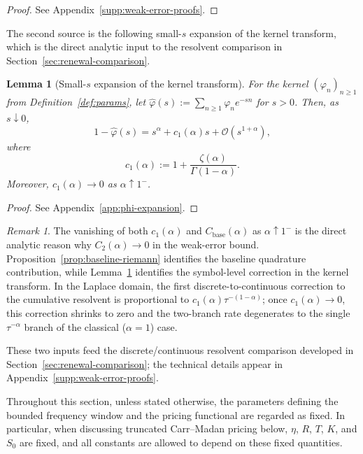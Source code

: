 \documentclass[letterpaper]{article}
\numberwithin{equation}{section}
\newtheorem{lemma}[theorem]{Lemma}
\theoremstyle{definition}
\theoremstyle{remark}
\newtheorem{remark}[theorem]{Remark}
\begin{document}
\begin{proof}
See Appendix~\ref{supp:weak-error-proofs}.
\end{proof}

The second source is the following small-$s$ expansion of the kernel transform,
which is the direct analytic input to the resolvent comparison in
Section~\ref{sec:renewal-comparison}.

\begin{lemma}[Small-$s$ expansion of the kernel transform]\label{lem:phi-expansion}
For the kernel $(\varphi_n)_{n\ge1}$ from Definition~\ref{def:params}, let $\hat\varphi(s):=\sum_{n\ge1}\varphi_n e^{-sn}$ for $s>0$. Then, as $s\downarrow0$,
\begin{equation}\label{eq:phi-expansion-main}
  1-\hat\varphi(s)=s^\alpha+c_1(\alpha)s+\mathcal O(s^{1+\alpha}),
\end{equation}
where
\begin{equation}\label{eq:c1-alpha-main}
  c_1(\alpha):=1+\frac{\zeta(\alpha)}{\Gamma(1-\alpha)}.
\end{equation}
Moreover, $c_1(\alpha)\to0$ as $\alpha\uparrow1^-$.
\end{lemma}

\begin{proof}
See Appendix~\ref{app:phi-expansion}.
\end{proof}

\begin{remark}
The vanishing of both $c_1(\alpha)$ and $C_{\mathrm{base}}(\alpha)$ as
$\alpha\uparrow1^-$ is the direct analytic reason why $C_2(\alpha)\to0$ in the
weak-error bound. Proposition~\ref{prop:baseline-riemann} identifies the
baseline quadrature contribution, while Lemma~\ref{lem:phi-expansion}
identifies the symbol-level correction in the kernel transform. In the Laplace
domain, the first discrete-to-continuous correction to the cumulative resolvent
is proportional to $c_1(\alpha)\tau^{-(1-\alpha)}$; once
$c_1(\alpha)\to0$, this correction shrinks to zero and the two-branch rate
degenerates to the single $\tau^{-\alpha}$ branch of the classical
($\alpha=1$) case.
\end{remark}

These two inputs feed the discrete/continuous resolvent comparison developed in Section~\ref{sec:renewal-comparison}; the technical details appear in Appendix~\ref{supp:weak-error-proofs}.

Throughout this section, unless stated otherwise, the parameters defining the bounded frequency window and the pricing functional are regarded as fixed. In particular, when discussing truncated Carr--Madan pricing below, $\eta$, $R$, $T$, $K$, and $S_0$ are fixed, and all constants are allowed to depend on these fixed quantities.
\end{document}
